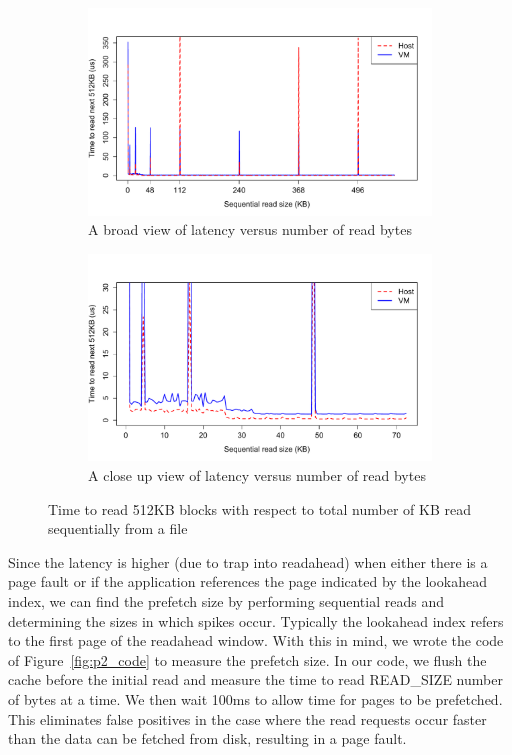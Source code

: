 \begin{figure}[ht!]
	\begin{subfigure}[t]{0.5\textwidth}
	\includegraphics[width=\textwidth]{./figures/p2_big.pdf}
	\caption{A broad view of latency versus number of read bytes}
	\label{fig:p2_graph_big}
	\end{subfigure}
	
	\begin{subfigure}[t]{0.5\textwidth}
	\includegraphics[width=\textwidth]{./figures/p2_small.pdf}
	\caption{A close up view of latency versus number of read bytes}
	\label{fig:p2_graph_small}
	\end{subfigure}
	\caption{Time to read 512KB blocks with respect to total number of KB read sequentially from a file}
\end{figure}

Since the latency is higher (due to trap into readahead) when either there is a page 
fault or if the application references the page indicated by the lookahead index,
we can find the prefetch size by performing sequential reads and determining
the sizes in which spikes occur. Typically the lookahead index refers to the first 
page of the readahead window. With this in mind, we wrote the code of 
Figure~\ref{fig:p2_code} to measure the prefetch size. In our code, we flush 
the cache before the initial read and measure the time to read READ\_SIZE number of
bytes at a time. We then wait 100ms to allow time for pages to be prefetched. This
eliminates false positives in the case where the read requests occur faster than
the data can be fetched from disk, resulting in a page fault.

